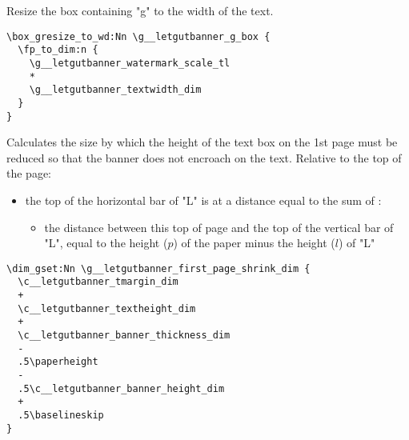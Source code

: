 \documentclass{letgut}
\begin{document}
Resize the box containing "g" to the width of the text.
\begin{lstlisting}
\box_gresize_to_wd:Nn \g__letgutbanner_g_box {
  \fp_to_dim:n {
    \g__letgutbanner_watermark_scale_tl
    *
    \g__letgutbanner_textwidth_dim
  }
}
\end{lstlisting}
Calculates the size by which the height of the text box on the 1st page must be
reduced so that the banner does not encroach on the text. Relative to the top of
the page:
\begin{itemize}
\item the top of the horizontal bar of "L" is at a distance equal to the sum of :
\begin{itemize}
\item the distance between this top of page and the top of the vertical bar of
"L", equal to the height (\(p\)) of the paper minus the height (\(l\)) of "L"
\end{itemize}
\end{itemize}
\begin{lstlisting}
\dim_gset:Nn \g__letgutbanner_first_page_shrink_dim {
  \c__letgutbanner_tmargin_dim
  +
  \c__letgutbanner_textheight_dim
  +
  \c__letgutbanner_banner_thickness_dim
  -
  .5\paperheight
  -
  .5\c__letgutbanner_banner_height_dim
  +
  .5\baselineskip
}
\end{lstlisting}
\end{document}
